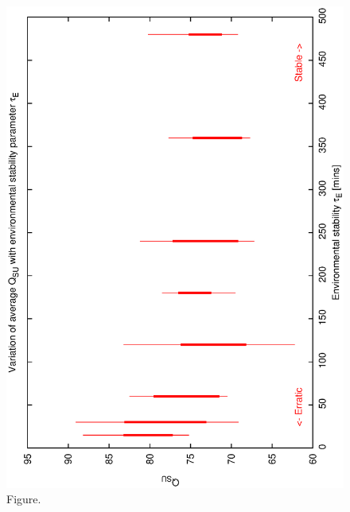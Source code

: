 \documentclass[12pt,a4paper]{article}
\begin{document}
\begin{figure}[htbp]
 \begin{center}
  \includegraphics[scale=1.0, angle=0]{figures/biasrs_de.eps}
 \end{center}
  \caption[Figure.]
{Figure.}
\end{figure}
\clearpage
\end{document}

